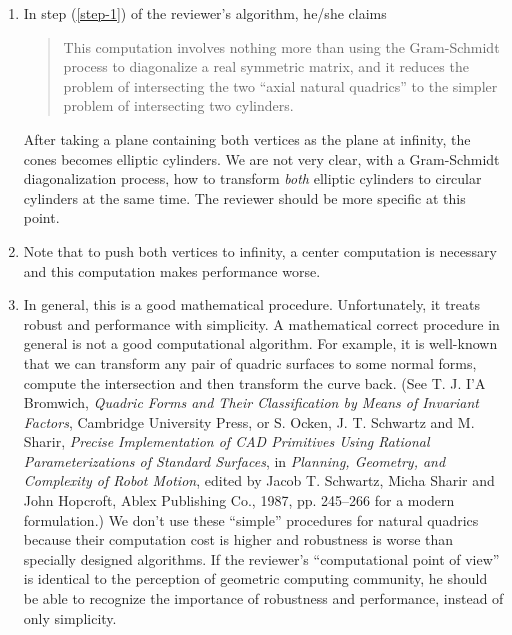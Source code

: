 \begin{enumerate}
     \item In step (\ref{step-1}) of the reviewer's algorithm, he/she claims
          \begin{quote}
               This computation involves nothing more than using the
               Gram-Schmidt process to diagonalize a real symmetric matrix,
               and it reduces the problem of intersecting the two ``axial
               natural quadrics'' to the simpler problem of intersecting
               two cylinders.
          \end{quote}
          After taking a plane containing both vertices as the plane at
          infinity, the cones becomes elliptic cylinders.  We are not very
          clear, with a Gram-Schmidt diagonalization process, how to transform
          {\em both} elliptic cylinders to circular cylinders
          at the same time.  The reviewer should be more specific
          at this point.

     \item Note that to push both vertices to infinity, a center computation
          is necessary and this computation makes performance worse.

     \item In general, this is a good mathematical procedure.  Unfortunately,
          it treats robust and performance with simplicity.  A mathematical
          correct procedure in general is not a good computational algorithm.
          For example, it is well-known that we can transform any pair of
          quadric surfaces to some normal forms, compute the intersection and
          then transform the curve back. (See T. J. I'A Bromwich,
          {\em Quadric Forms and Their Classification by Means of Invariant
          Factors}, Cambridge University Press,
          or S. Ocken, J. T. Schwartz and M. Sharir,
          {\em Precise Implementation of CAD Primitives Using Rational
          Parameterizations of Standard Surfaces}, in {\em Planning,
          Geometry, and Complexity of Robot Motion}, edited by Jacob T.
          Schwartz, Micha Sharir and John Hopcroft, Ablex Publishing Co.,
          1987, pp. 245--266 for a modern formulation.)
          We don't use these ``simple'' procedures for natural quadrics
          because their computation cost is higher and robustness is worse
          than specially designed algorithms.  If the reviewer's
          ``computational point of view'' is identical to the perception of
          geometric computing community, he should be able to recognize the
          importance of robustness and performance, instead of only simplicity.


\end{enumerate}
